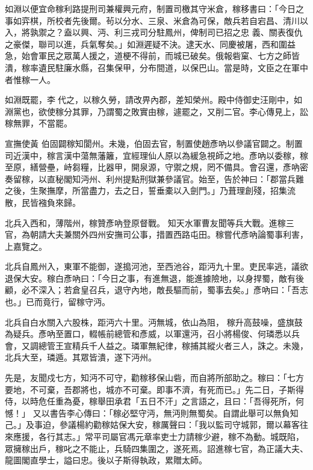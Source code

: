 \begin{pinyinscope}
 如淵以便宜命稼利路提刑司兼權興元府，制置司檄其守米倉，稼移書曰：「今日之事如弈棋，所校者先後爾。茍以分水、三泉、米倉為可保，敵兵若自宕昌、清川以入，將孰禦之？盍以興、沔、利三戎司分駐鳳州，俾制司已招之忠
 義、關表復仇之豪傑，聯司以進，兵氣奪矣。」如淵遲疑不決。逮天水、同慶被屠，西和圍益急，始會軍民之眾萬人援之，道梗不得前，而城已破矣。俄報砦窠、七方之師皆潰，稼率遺民駐廉水縣，召集保甲，分布間道，以保巴山。當是時，文臣之在軍中者惟稼一人。



 如淵既罷，李𡌴代之，以稼久勞，請改畀內郡，差知榮州。殿中侍御史汪剛中，如淵黨也，欲使稼分其罪，乃謂蜀之敗實由稼，遽罷之，又削二官。李心傳見上，訟稼無罪，不當罷。



 宣撫使黃
 伯固闢稼知閬州。未幾，伯固去官，制置使趙彥吶以參議官闢之。制置司近漢中，稼言漢中蕩無藩籬，宜經理仙人原以為緩急視師之地。彥吶以委稼，稼至原，繕營壘，峙芻糧，比器甲，開泉源，守禦之規，罔不備具。會召還，彥吶密奏留稼，以直秘閣知沔州、利州提點刑獄兼參議官。始至，告於神曰：「郡當兵難之後，生聚撫摩，所當盡力，去之日，誓垂橐以入劍門。」乃葺理創殘，招集流散，民皆襁負來歸。



 北兵入西和，薄階州，稼贊彥吶登原督戰。
 知天水軍曹友聞等兵大戰。進稼三官，為朝請大夫兼關外四州安撫司公事，措置西路屯田。稼嘗代彥吶論蜀事利害，上嘉覽之。



 北兵自鳳州入，東軍不能御，遂搗河池，至西池谷，距沔九十里。吏民率逃，議欲退保大安。稼白彥吶曰：「今日之事，有進無退，能進據險地，以身捍蜀，敵有後顧，必不深入；若倉皇召兵，退守內地，敵長驅而前，蜀事去矣。」彥吶曰：「吾志也。」已而竟行，留稼守沔。



 北兵自白水關入六股株，距沔六十里。沔無城，依山為阻，
 稼升高鼓噪，盛旗鼓為疑兵。彥吶至置口，輟帳前總管和彥威，以軍還沔，召小將楊俊、何璘悉以兵會，又調總管王宣精兵千人益之。璘軍無紀律，稼捕其縱火者三人，誅之。未幾，北兵大至，璘遁。其眾皆潰，遂下沔州。



 先是，友聞戍七方，知沔不可守，勸稼移保山砦，而自將所部助之。稼曰：「七方要地，不可棄，吾郡將也，城亦不可棄。即事不濟，有死而已。」先二日，子斯得侍，以時危任重為憂，稼舉田承君「五日不汗」之言語之，且曰：「吾得死所，何憾！」
 又以書告李心傳曰：「稼必堅守沔，無沔則無蜀矣。自謂此舉可以無負知己。」及事迫，參議楊約勸稼姑保大安，稼厲聲曰：「我以監司守城郭，爾以幕客往來應援，各行其志。」常平司屬官馮元章率吏士力請稼少避，稼不為動。城既陷，眾擁稼出戶，稼叱之不能止，兵騎四集圍之，遂死焉。詔進稼七官，為正議大夫、龍圖閣直學士，謚曰忠。後以子斯得執政，累贈太師。




\end{pinyinscope}
